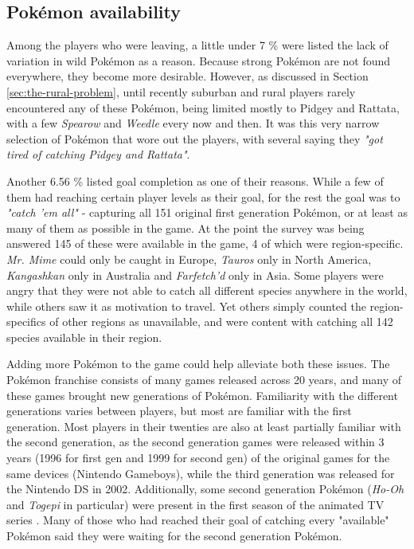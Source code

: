 \subsection{Pokémon availability}
\label{sec:pokemon-availability-and-goal-completion}
Among the players who were leaving, a little under 7 \% were listed the lack of variation in wild Pokémon as a reason. Because strong Pokémon are not found everywhere, they become more desirable. However, as discussed in Section \ref{sec:the-rural-problem}, until recently suburban and rural players rarely encountered any of these Pokémon, being limited mostly to Pidgey and Rattata, with a few \emph{Spearow} and \emph{Weedle} every now and then. It was this very narrow selection of Pokémon that wore out the players, with several saying they \emph{"got tired of catching Pidgey and Rattata"}.

Another 6.56 \% listed goal completion as one of their reasons. While a few of them had reaching certain player levels as their goal, for the rest the goal was to \emph{"catch 'em all"} - capturing all 151 original first generation Pokémon, or at least as many of them as possible in the game. At the point the survey was being answered 145 of these were available in the game, 4 of which were region-specific. \emph{Mr. Mime} could only be caught in Europe, \emph{Tauros} only in North America, \emph{Kangashkan} only in Australia and \emph{Farfetch'd} only in Asia. Some players were angry that they were not able to catch all different species anywhere in the world, while others saw it as motivation to travel. Yet others simply counted the region-specifics of other regions as unavailable, and were content with catching all 142 species available in their region.

Adding more Pokémon to the game could help alleviate both these issues. The Pokémon franchise consists of many games released across 20 years, and many of these games brought new generations of Pokémon. Familiarity with the different generations varies between players, but most are familiar with the first generation. Most players in their twenties are also at least partially familiar with the second generation, as the second generation games were released within 3 years (1996 for first gen and 1999 for second gen) of the original games for the same devices (Nintendo Gameboys), while the third generation was released for the Nintendo DS in 2002. Additionally, some second generation Pokémon (\emph{Ho-Oh} and \emph{Togepi} in particular) were present in the first season of the animated TV series . Many of those who had reached their goal of catching every "available" Pokémon said they were waiting for the second generation Pokémon.

